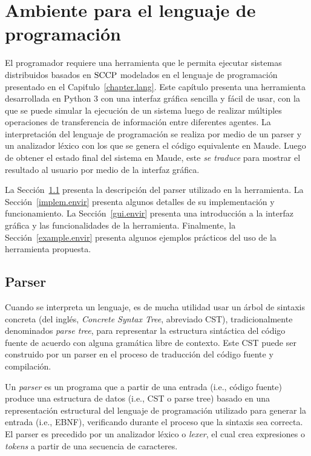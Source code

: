 
\chapter{Ambiente para el lenguaje de programaci\'on}
\label{chapter.envir}

El programador requiere una herramienta que le permita ejecutar sistemas distribuidos basados en $\textnormal{SCCP}$ modelados en el lenguaje de programaci\'on presentado en el Capi\'tulo~\ref{chapter.lang}. Este cap\'itulo presenta una herramienta desarrollada en Python 3 con una interfaz gr\'afica sencilla y f\'acil de usar, con la que se puede simular la ejecuci\'on de un sistema luego de realizar m\'ultiples operaciones de transferencia de informaci\'on entre diferentes agentes. La interpretaci\'on del lenguaje de programaci\'on se realiza por medio de un parser y un analizador l\'exico con los que se genera el c\'odigo equivalente en Maude. Luego de obtener el estado final del sistema en Maude, este \textit{se traduce} para mostrar el resultado al usuario por medio de la interfaz gr\'afica.

La Secci\'on~\ref{parser.envir} presenta la descripci\'on del parser utilizado en la herramienta. La Secci\'on~\ref{implem.envir} presenta algunos detalles de su implementaci\'on y funcionamiento. La Secci\'on~\ref{gui.envir} presenta una introducci\'on a la interfaz gr\'afica y las funcionalidades de la herramienta. Finalmente, la Secci\'on~\ref{example.envir} presenta algunos ejemplos  pr\'acticos del uso de la herramienta propuesta.

\section{Parser}
\label{parser.envir}

Cuando se interpreta un lenguaje, es de mucha utilidad usar un \'arbol de sintaxis concreta (del ingl\'es, \textit{Concrete Syntax Tree}, abreviado CST), tradicionalmente denominados \textit{parse tree}, para representar la estructura sint\'actica del c\'odigo fuente de acuerdo con alguna gram\'atica libre de contexto. Este CST puede ser construido por un parser en el proceso de traducci\'on del c\'odigo fuente y compilaci\'on. 

Un \textit{parser} es un programa que a partir de una entrada (i.e., c\'odigo fuente) produce una estructura de datos (i.e., CST o parse tree) basado en una representaci\'on estructural del lenguaje de programaci\'on utilizado para generar la entrada (i.e., EBNF), verificando durante el proceso que la sintaxis sea correcta. El parser es precedido por un analizador l\'exico o \textit{lexer}, el cual crea expresiones o \textit{tokens} a partir de una secuencia de caracteres. 

